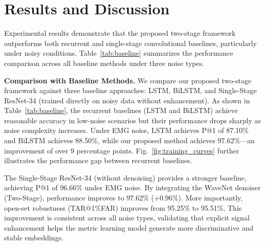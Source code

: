 \documentclass[conference]{IEEEtran}
\begin{document}
\section{Results and Discussion}

Experimental results demonstrate that the proposed two-stage framework outperforms both recurrent and single-stage convolutional baselines, particularly under noisy conditions. Table~\ref{tab:baseline} summarizes the performance comparison across all baseline methods under three noise types.

\textbf{Comparison with Baseline Methods.} We compare our proposed two-stage framework against three baseline approaches: LSTM, BiLSTM, and Single-Stage ResNet-34 (trained directly on noisy data without enhancement). As shown in Table~\ref{tab:baseline}, the recurrent baselines (LSTM and BiLSTM) achieve reasonable accuracy in low-noise scenarios but their performance drops sharply as noise complexity increases. Under EMG noise, LSTM achieves P@1 of 87.10\% and BiLSTM achieves 88.50\%, while our proposed method achieves 97.62\%---an improvement of over 9 percentage points. Fig.~\ref{fig:training_curves} further illustrates the performance gap between recurrent baselines.

The Single-Stage ResNet-34 (without denoising) provides a stronger baseline, achieving P@1 of 96.66\% under EMG noise. By integrating the WaveNet denoiser (Two-Stage), performance improves to 97.62\% (+0.96\%). More importantly, open-set robustness (TAR@1\%FAR) improves from 95.25\% to 95.51\%. This improvement is consistent across all noise types, validating that explicit signal enhancement helps the metric learning model generate more discriminative and stable embeddings.
\end{document}
